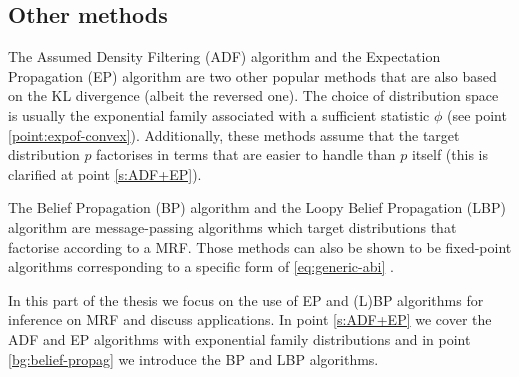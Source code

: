\subsection{Other methods}

The Assumed Density Filtering (ADF) algorithm and the  Expectation Propagation (EP) algorithm are two other popular methods that are also based on the KL divergence (albeit the reversed one). 
The choice of distribution space is usually the exponential family associated with a sufficient statistic $\phi$ (see point \ref{point:expof-convex}). Additionally, these methods assume that the target distribution $p$ factorises in terms that are easier to handle than $p$ itself (this is clarified at point \ref{s:ADF+EP}).

The Belief Propagation (BP) algorithm and the Loopy Belief Propagation (LBP) algorithm are message-passing algorithms which target distributions that factorise according to a MRF. Those methods can also be shown to be fixed-point algorithms corresponding to a specific form of \eqref{eq:generic-abi} \citep{yedidia01, yedidia02}.

In this part of the thesis we focus on the use of EP and (L)BP algorithms for inference on MRF and discuss applications. In point \ref{s:ADF+EP} we cover the ADF and EP algorithms with exponential family distributions and in point \ref{bg:belief-propag} we introduce the BP and LBP algorithms.




